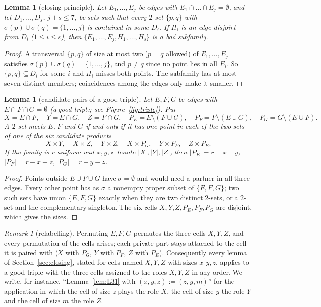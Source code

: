 \documentclass[11pt]{amsart}
\newtheorem{lemma}[theorem]{Lemma}
\theoremstyle{definition}
\theoremstyle{remark}
\newtheorem{remark}[theorem]{Remark}
\begin{document}
\begin{lemma}[closing principle]\label{lem:close}
Let $E_1,\dots,E_j$ be edges with $E_1\cap\dots\cap E_j=\emptyset$, and let $D_1,\dots,D_s$, $j+s\le7$, be sets such that every $2$-set $\{p,q\}$ with $\sigma(p)\cup\sigma(q)=\{1,\dots,j\}$ is contained in some $D_i$. If $H_i$ is an edge disjoint from $D_i$ ($1\le i\le s$), then $\{E_1,\dots,E_j,H_1,\dots,H_s\}$ is a bad subfamily.
\end{lemma}
\begin{proof}
A transversal $\{p,q\}$ of size at most two ($p=q$ allowed) of $E_1,\dots,E_j$ satisfies $\sigma(p)\cup\sigma(q)=\{1,\dots,j\}$, and $p\ne q$ since no point lies in all $E_i$. So $\{p,q\}\subseteq D_i$ for some $i$ and $H_i$ misses both points. The subfamily has at most seven distinct members; coincidences among the edges only make it smaller.
\end{proof}

\begin{lemma}[candidate pairs of a good triple]\label{lem:cand3}
Let $E,F,G$ be edges with $E\cap F\cap G=\emptyset$ (a \emph{good triple}; see Figure~\ref{fig:triple}). Put
\[
X=E\cap F,\quad Y=E\cap G,\quad Z=F\cap G,\quad P_E=E\setminus(F\cup G),\quad P_F=F\setminus(E\cup G),\quad P_G=G\setminus(E\cup F).
\]
A $2$-set meets $E$, $F$ and $G$ if and only if it has one point in each of the two sets of one of the six \emph{candidate products}
\[
X\times Y,\quad X\times Z,\quad Y\times Z,\quad X\times P_G,\quad Y\times P_F,\quad Z\times P_E .
\]
If the family is $r$-uniform and $x,y,z$ denote $|X|,|Y|,|Z|$, then $|P_E|=r-x-y$, $|P_F|=r-x-z$, $|P_G|=r-y-z$.
\end{lemma}
\begin{proof}
Points outside $E\cup F\cup G$ have $\sigma=\emptyset$ and would need a partner in all three edges. Every other point has as $\sigma$ a nonempty proper subset of $\{E,F,G\}$; two such sets have union $\{E,F,G\}$ exactly when they are two distinct $2$-sets, or a $2$-set and the complementary singleton. The six cells $X,Y,Z,P_E,P_F,P_G$ are disjoint, which gives the sizes.
\end{proof}

\begin{remark}[relabelling]\label{rem:relabel}
Permuting $E,F,G$ permutes the three cells $X,Y,Z$, and every permutation of the cells arises; each private part stays attached to the cell it is paired with ($X$ with $P_G$, $Y$ with $P_F$, $Z$ with $P_E$). Consequently every lemma of Section~\ref{sec:closing}, stated for cells named $X,Y,Z$ with sizes $x,y,z$, applies to a good triple with the three cells assigned to the roles $X,Y,Z$ in any order. We write, for instance, ``Lemma~\ref{lem:L31} with $(x,y,z):=(z,y,m)$'' for the application in which the cell of size $z$ plays the role $X$, the cell of size $y$ the role $Y$ and the cell of size $m$ the role $Z$.
\end{remark}
\end{document}
